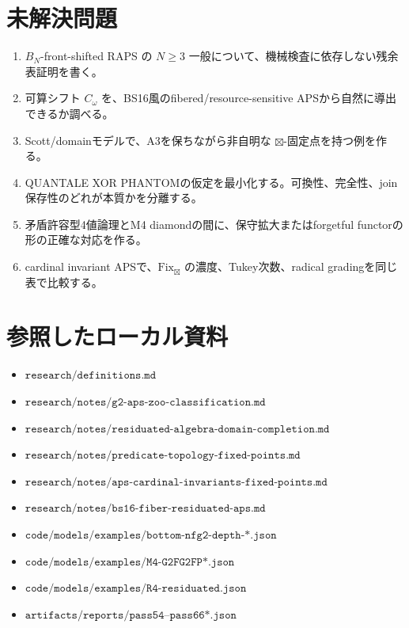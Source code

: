\documentclass[uplatex,dvipdfmx,a4paper,10pt]{jsarticle}
\newcommand{\Fix}{\mathrm{Fix}}
\newcommand{\bt}{\boxtimes}
\begin{document}
\section{未解決問題}

\begin{enumerate}
  \item \(B_N\)-front-shifted RAPS の \(N\ge3\) 一般について、機械検査に依存しない残余表証明を書く。
  \item 可算シフト \(C_\omega\) を、BS16風のfibered/resource-sensitive APSから自然に導出できるか調べる。
  \item Scott/domainモデルで、A3を保ちながら非自明な \(\bt\)-固定点を持つ例を作る。
  \item QUANTALE XOR PHANTOMの仮定を最小化する。可換性、完全性、join保存性のどれが本質かを分離する。
  \item 矛盾許容型4値論理とM4 diamondの間に、保守拡大またはforgetful functorの形の正確な対応を作る。
  \item cardinal invariant APSで、\(\Fix_{\bt}\) の濃度、Tukey次数、radical gradingを同じ表で比較する。
\end{enumerate}

\section*{参照したローカル資料}

\begin{itemize}
  \item \(\texttt{research/definitions.md}\)
  \item \(\texttt{research/notes/g2-aps-zoo-classification.md}\)
  \item \(\texttt{research/notes/residuated-algebra-domain-completion.md}\)
  \item \(\texttt{research/notes/predicate-topology-fixed-points.md}\)
  \item \(\texttt{research/notes/aps-cardinal-invariants-fixed-points.md}\)
  \item \(\texttt{research/notes/bs16-fiber-residuated-aps.md}\)
  \item \(\texttt{code/models/examples/bottom-nfg2-depth-*.json}\)
  \item \(\texttt{code/models/examples/M4-G2FG2FP*.json}\)
  \item \(\texttt{code/models/examples/R4-residuated.json}\)
  \item \(\texttt{artifacts/reports/pass54--pass66*.json}\)
\end{itemize}
\end{document}
